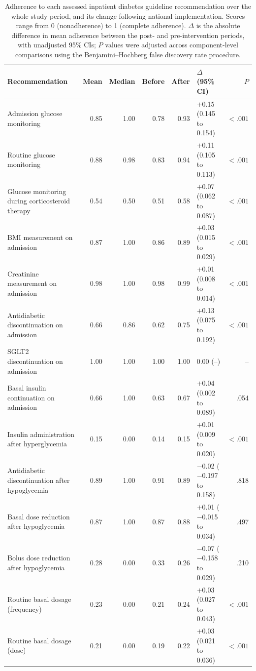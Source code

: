 \begin{table}[t]
\centering
\caption{Adherence to each assessed inpatient diabetes guideline
recommendation over the whole study period, and its change following
national implementation. Scores range from 0 (nonadherence) to 1 (complete
adherence). $\Delta$ is the absolute difference in mean adherence between the
post- and pre-intervention periods, with unadjusted 95\% CIs; $P$ values were
adjusted across component-level comparisons using the Benjamini--Hochberg
false discovery rate procedure.}
\label{tab:adherence}
\small
\setlength{\tabcolsep}{4pt}
\begin{tabularx}{\textwidth}{
>{\raggedright\arraybackslash}X
rrrrlr
}
\toprule
Recommendation & Mean & Median & Before & After & $\Delta$ (95\% CI) & $P$ \\
\midrule
Admission glucose monitoring
  & 0.85 & 1.00 & 0.78 & 0.93 & $+$0.15 (0.145 to 0.154) & $<.001$ \\
Routine glucose monitoring
  & 0.88 & 0.98 & 0.83 & 0.94 & $+$0.11 (0.105 to 0.113) & $<.001$ \\
Glucose monitoring during corticosteroid therapy
  & 0.54 & 0.50 & 0.51 & 0.58 & $+$0.07 (0.062 to 0.087) & $<.001$ \\
BMI measurement on admission
  & 0.87 & 1.00 & 0.86 & 0.89 & $+$0.03 (0.015 to 0.029) & $<.001$ \\
Creatinine measurement on admission
  & 0.98 & 1.00 & 0.98 & 0.99 & $+$0.01 (0.008 to 0.014) & $<.001$ \\
Antidiabetic discontinuation on admission
  & 0.66 & 0.86 & 0.62 & 0.75 & $+$0.13 (0.075 to 0.192) & $<.001$ \\
SGLT2 discontinuation on admission
  & 1.00 & 1.00 & 1.00 & 1.00 & 0.00 (--) & -- \\
Basal insulin continuation on admission
  & 0.66 & 1.00 & 0.63 & 0.67 & $+$0.04 (0.002 to 0.089) & .054 \\
Insulin administration after hyperglycemia
  & 0.15 & 0.00 & 0.14 & 0.15 & $+$0.01 (0.009 to 0.020) & $<.001$ \\
Antidiabetic discontinuation after hypoglycemia
  & 0.89 & 1.00 & 0.91 & 0.89 & $-$0.02 ($-$0.197 to 0.158) & .818 \\
Basal dose reduction after hypoglycemia
  & 0.87 & 1.00 & 0.87 & 0.88 & $+$0.01 ($-$0.015 to 0.034) & .497 \\
Bolus dose reduction after hypoglycemia
  & 0.28 & 0.00 & 0.33 & 0.26 & $-$0.07 ($-$0.158 to 0.029) & .210 \\
Routine basal dosage (frequency)
  & 0.23 & 0.00 & 0.21 & 0.24 & $+$0.03 (0.027 to 0.043) & $<.001$ \\
Routine basal dosage (dose)
  & 0.21 & 0.00 & 0.19 & 0.22 & $+$0.03 (0.021 to 0.036) & $<.001$ \\
\bottomrule
\end{tabularx}
\end{table}

